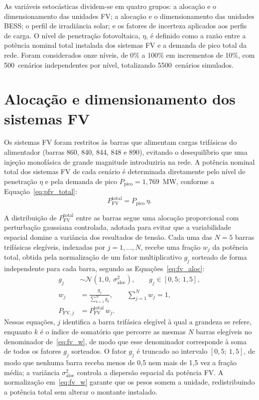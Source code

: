 As variáveis estocásticas dividem-se em quatro grupos: a alocação e o dimensionamento das unidades FV; a alocação e o dimensionamento das unidades BESS; o perfil de irradiância solar; e os fatores de incerteza aplicados aos perfis de carga. O nível de penetração fotovoltaica, $\eta$, é definido como a razão entre a potência nominal total instalada dos sistemas FV e a demanda de pico total da rede. Foram considerados onze níveis, de 0\% a 100\% em incrementos de 10\%, com 500~cenários independentes por nível, totalizando 5500~cenários simulados.

\section{Alocação e dimensionamento dos sistemas FV}
\label{sec:alocacao_fv}

Os sistemas FV foram restritos às barras que alimentam cargas trifásicas do alimentador (barras 860, 840, 844, 848 e 890), evitando o desequilíbrio que uma injeção monofásica de grande magnitude introduziria na rede. A potência nominal total dos sistemas FV de cada cenário é determinada diretamente pelo nível de penetração $\eta$ e pela demanda de pico $P_\text{pico} = 1{,}769$~MW, conforme a Equação~\eqref{eq:pfv_total}:
\begin{equation}
  P_\text{FV}^\text{total} = P_\text{pico}\,\eta.
  \label{eq:pfv_total}
\end{equation}

A distribuição de $P_\text{FV}^\text{total}$ entre as barras segue uma alocação proporcional com perturbação gaussiana controlada, adotada para evitar que a variabilidade espacial domine a variância dos resultados de tensão. Cada uma das $N=5$ barras trifásicas elegíveis, indexadas por $j = 1, \ldots, N$, recebe uma fração $w_j$ da potência total, obtida pela normalização de um fator multiplicativo $g_j$ sorteado de forma independente para cada barra, segundo as Equações~\eqref{eq:fv_aloc}:
\begin{subequations}
  \label{eq:fv_aloc}
  \begin{align}
    g_j &\sim \mathcal{N}(1{,}0,\ \sigma_\text{aloc}^2), \qquad g_j \in [0{,}5;\ 1{,}5], \label{eq:fv_g}\\
    w_j &= \frac{g_j}{\sum_{k=1}^{N} g_k}, \qquad \sum_{j=1}^{N} w_j = 1, \label{eq:fv_w}\\
    P_{\text{FV},j} &= P_\text{FV}^\text{total}\, w_j. \label{eq:fv_pj}
  \end{align}
\end{subequations}
Nessas equações, $j$ identifica a barra trifásica elegível à qual a grandeza se refere, enquanto $k$ é o índice de somatório que percorre as mesmas $N$ barras elegíveis no denominador de~\eqref{eq:fv_w}, de modo que esse denominador corresponde à soma de todos os fatores $g_j$ sorteados. O fator $g_j$ é truncado ao intervalo $[0{,}5;\ 1{,}5]$, de modo que nenhuma barra receba menos de 0,5 nem mais de 1,5 vez a fração média; a variância $\sigma_\text{aloc}^2$ controla a dispersão espacial da potência FV. A normalização em~\eqref{eq:fv_w} garante que os pesos somem a unidade, redistribuindo a potência total sem alterar o montante instalado.

